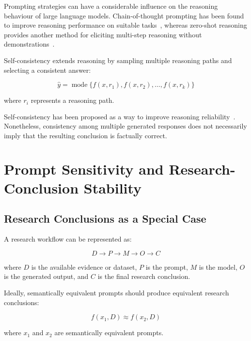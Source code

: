\documentclass[acmsmall,screen,review]{acmart}
\begin{document}
Prompting strategies can have a considerable influence on the reasoning behaviour of large language models. Chain-of-thought prompting has been found to improve reasoning performance on suitable tasks~\cite{wei2022}, whereas zero-shot reasoning provides another method for eliciting multi-step reasoning without demonstrations~\cite{kojima2022}.

Self-consistency extends reasoning by sampling multiple reasoning paths and selecting a consistent answer:

\begin{equation}
\hat{y}=\operatorname{mode}\{f(x,r_1),f(x,r_2),\ldots,f(x,r_k)\}
\label{eq:self-consistency}
\end{equation}

where $r_i$ represents a reasoning path.

Self-consistency has been proposed as a way to improve reasoning reliability~\cite{wang2023}. Nonetheless, consistency among multiple generated responses does not necessarily imply that the resulting conclusion is factually correct.

\section{Prompt Sensitivity and Research-Conclusion Stability}
\label{sec:stability}

\subsection{Research Conclusions as a Special Case}

A research workflow can be represented as:

\begin{equation}
D \rightarrow P \rightarrow M \rightarrow O \rightarrow C
\label{eq:pipeline}
\end{equation}

where $D$ is the available evidence or dataset, $P$ is the prompt, $M$ is the model, $O$ is the generated output, and $C$ is the final research conclusion.

Ideally, semantically equivalent prompts should produce equivalent research conclusions:

\begin{equation}
f(x_1,D)\approx f(x_2,D)
\label{eq:ideal}
\end{equation}

where $x_1$ and $x_2$ are semantically equivalent prompts.
\end{document}
